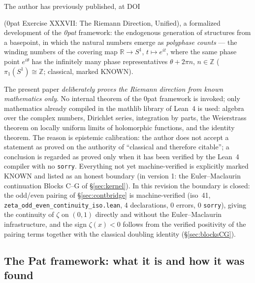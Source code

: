\documentclass{article}
\newcommand{\R}{\mathbb{R}}
\newcommand{\Z}{\mathbb{Z}}
\newcommand{\zt}{\zeta}
\begin{document}
The author has previously published, at DOI

(0pat Exercise XXXVII: The Riemann Direction, Unified), a formalized
development of the \emph{0pat} framework: the endogenous generation of
structures from a basepoint, in which the natural numbers emerge as
\emph{polyphase counts} --- the winding numbers of the covering map
$\R\to S^1$, $t\mapsto e^{it}$, where the same phase point $e^{i\theta}$ has
the infinitely many phase representatives $\theta+2\pi n$, $n\in\Z$
($\pi_1(S^1)\cong\Z$; classical, marked KNOWN).

The present paper \emph{deliberately proves the Riemann direction from known
mathematics only}. No internal theorem of the 0pat framework is invoked;
only mathematics already compiled in the mathlib library of Lean~4 is used:
algebra over the complex numbers, Dirichlet series, integration by parts, the
Weierstrass theorem on locally uniform limits of holomorphic functions, and
the identity theorem. The reason is epistemic calibration: the author does
not accept a statement as proved on the authority of ``classical and
therefore citable''; a conclusion is regarded as proved only when it has been
verified by the Lean~4 compiler with no \texttt{sorry}. Everything not yet
machine-verified is explicitly marked KNOWN and listed as an honest boundary
(in version 1: the Euler--Maclaurin continuation Blocks C--G of
\S\ref{sec:kernel}). In this revision the boundary is closed: the odd/even
pairing of \S\ref{sec:contbridge} is machine-verified (iso~41,
\texttt{zeta\_odd\_even\_continuity\_iso.lean}, 4 declarations, 0 errors,
0 \texttt{sorry}), giving the continuity of $\zt$ on $(0,1)$ directly and
without the Euler--Maclaurin infrastructure, and the sign $\zt(x)<0$ follows
from the verified positivity of the pairing terms together with the
classical doubling identity (\S\ref{sec:blocksCG}).

\subsection{The Pat framework: what it is and how it was found}
\label{sec:pat}
\end{document}
